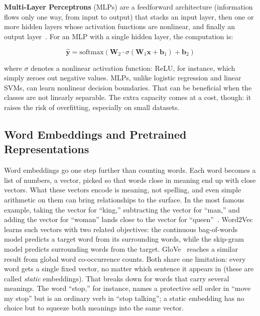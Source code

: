 \textbf{Multi-Layer Perceptrons} (MLPs) are a feedforward architecture (information flows only one way, from input to output) that stacks an input layer, then one or more hidden layers whose activation functions are nonlinear, and finally an output layer~\cite{goodfellow2016deep}. For an MLP with a single hidden layer, the computation is:

\begin{equation}
\hat{\mathbf{y}} = \text{softmax}(\mathbf{W}_2 \cdot \sigma(\mathbf{W}_1 \mathbf{x} + \mathbf{b}_1) + \mathbf{b}_2)
\label{eq:mlp}
\end{equation}

\noindent where $\sigma$ denotes a nonlinear activation function: ReLU, for instance, which simply zeroes out negative values. MLPs, unlike logistic regression and linear SVMs, can learn nonlinear decision boundaries. That can be beneficial when the classes are not linearly separable. The extra capacity comes at a cost, though: it raises the risk of overfitting, especially on small datasets.

\subsection{Word Embeddings and Pretrained Representations}
\label{sec:embeddings}

Word embeddings go one step further than counting words. Each word becomes a list of numbers, a vector, picked so that words close in meaning end up with close vectors. What these vectors encode is meaning, not spelling, and even simple arithmetic on them can bring relationships to the surface. In the most famous example, taking the vector for ``king,'' subtracting the vector for ``man,'' and adding the vector for ``woman'' lands close to the vector for ``queen''~\cite{mikolov2013efficient}. Word2Vec~\cite{mikolov2013efficient, mikolov2013distributed} learns such vectors with two related objectives: the continuous bag-of-words model predicts a target word from its surrounding words, while the skip-gram model predicts surrounding words from the target. GloVe~\cite{pennington2014glove} reaches a similar result from global word co-occurrence counts. Both share one limitation: every word gets a single fixed vector, no matter which sentence it appears in (these are called \emph{static} embeddings). That breaks down for words that carry several meanings. The word ``stop,'' for instance, names a protective sell order in ``move my stop'' but is an ordinary verb in ``stop talking''; a static embedding has no choice but to squeeze both meanings into the same vector.

